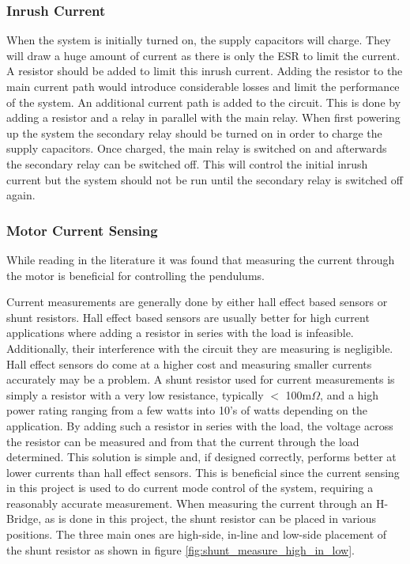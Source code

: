 \subsubsection{Inrush Current}
\label{ssub:inrush_current}
When the system is initially turned on, the supply capacitors will charge.
They will draw a huge amount of current as there is only the ESR to limit the current. 
A resistor should be added to limit this inrush current. 
Adding the resistor to the main current path would introduce considerable losses and limit the performance of the system.
An additional current path is added to the circuit.
This is done by adding a resistor and a relay in parallel with the main relay.
When first powering up the system the secondary relay should be turned on in order to charge the supply capacitors.
Once charged, the main relay is switched on and afterwards the secondary relay can be switched off.
This will control the initial inrush current but the system should not be run until the secondary relay is switched off again.






\subsubsection{Motor Current Sensing}
While reading in the literature it was found that measuring the current through the motor is beneficial for controlling the pendulums.

Current measurements are generally done by either hall effect based sensors or shunt resistors. 
Hall effect based sensors are usually better for high current applications where adding a resistor in series with the load is infeasible. 
Additionally, their interference with the circuit they are measuring is negligible.
Hall effect sensors do come at a higher cost and measuring smaller currents accurately may be a problem.
A shunt resistor used for current measurements is simply a resistor with a very low resistance, typically $<$ 100m$\Omega$, and a high power rating ranging from a few watts into 10's of watts depending on the application.
By adding such a resistor in series with the load, the voltage across the resistor can be measured and from that the current through the load determined.
This solution is simple and, if designed correctly, performs better at lower currents than hall effect sensors.
This is beneficial since the current sensing in this project is used to do current mode control of the system, requiring a reasonably accurate measurement.
When measuring the current through an H-Bridge, as is done in this project, the shunt resistor can be placed in various positions.
The three main ones are high-side, in-line and low-side placement of the shunt resistor as shown in figure \ref{fig:shunt_measure_high_in_low}.

